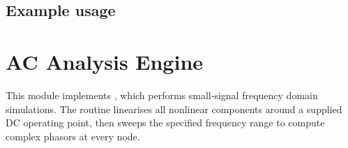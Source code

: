 \documentclass[letterpaper,10pt,english]{sphinxmanual}
\begin{document}
\section{Example usage}
\label{\detokenize{waveforms:example-usage}}
\begin{sphinxVerbatim}[commandchars=\\\{\}]
 

  
     
     
     
     
     
     
     
     

    
\end{sphinxVerbatim}

\sphinxstepscope


\chapter{AC Analysis Engine}
\label{\detokenize{ac_engine:ac-analysis-engine}}\label{\detokenize{ac_engine:ac-engine-module}}\label{\detokenize{ac_engine::doc}}
\sphinxAtStartPar
This module implements {\hyperref[\detokenize{ac_engine:ACEngine}]{}}, which performs small‑signal frequency domain simulations.
The routine linearises all nonlinear components around a supplied DC operating point,
then sweeps the specified frequency range to compute complex phasors at every node.
\end{document}
